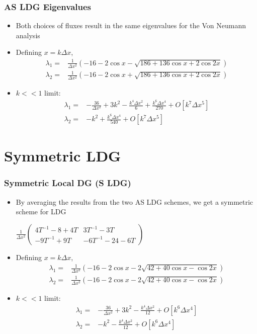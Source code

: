 \documentclass[serif,12pt]{beamer}
\begin{document}
\begin{frame}
\frametitle{AS LDG Eigenvalues}
	\begin{itemize}
		\item Both choices of fluxes result in the same eigenvalues for the Von Neumann analysis
		\item Defining $x = k\Delta x$,
		\begin{align*}
			\lambda_1 = & \frac{1}{\Delta x^2}\left(-16 - 2 \cos x - \sqrt{186 + 136 \cos x + 2 \cos 2x}\right)\\
			\lambda_2 = & \frac{1}{\Delta x^2}\left(-16 - 2 \cos x + \sqrt{186 + 136 \cos x + 2 \cos 2x}\right)
		\end{align*}
		\item $k << 1$ limit:
		\begin{align*}
			\lambda_1 = & -\frac{36}{\Delta x^2} + 3 k^2 - \frac{k^4\Delta x^2}{6} + \frac{k^6\Delta x^4}{270} + O[k^7\Delta x^5]\\
			\lambda_2 = & -k^2 + \frac{k^6\Delta x^4}{540} + O[k^7\Delta x^5]
		\end{align*}
	\end{itemize}
\end{frame}

\section{Symmetric LDG}
\begin{frame}
\frametitle{Symmetric Local DG (S LDG)}
	\begin{itemize}
		\item By averaging the results from the two AS LDG schemes, we get a symmetric scheme for LDG\\
		\begin{center}
		$\frac{1}{\Delta x^2}\left(
		\begin{array}{cc}
		4T^{-1} -8+4 T & 3T^{-1}-3 T \\
		 -9 T^{-1} +9 T & -6 T^{-1} -24-6 T
		\end{array}
		\right)$
		\end{center}
		\item Defining $x = k\Delta x$,
		\begin{align*}
			\lambda_1 = & \frac{1}{\Delta x^2}\left(-16 - 2 \cos x - 2 \sqrt{42 + 40 \cos x - \cos 2x}\right)\\
			\lambda_2 = & \frac{1}{\Delta x^2}\left(-16 - 2 \cos x - 2 \sqrt{42 + 40 \cos x - \cos 2x}\right)
		\end{align*}
		\item $k << 1$ limit:
		\begin{align*}
			\lambda_1 = & -\frac{36}{\Delta x^2} + 3 k^2 - \frac{k^4\Delta x^2}{12} + O[k^6\Delta x^4]\\
			\lambda_2 = & -k^2 - \frac{k^4\Delta x^2}{12} +  O[k^6\Delta x^4]
		\end{align*}
	\end{itemize}
\end{frame}
\end{document}
